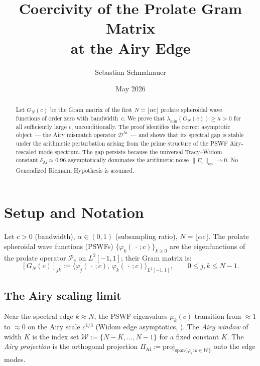 \documentclass[12pt,a4paper]{amsart}
\title{Coercivity of the Prolate Gram Matrix\\at the Airy Edge}
\author{Sebastian Schmalnauer}
\date{May 2026}
\theoremstyle{definition}
\newcommand{\DAi}{\mathcal{D}^{\mathrm{Ai}}}
\newcommand{\PAi}{\Pi_{\mathrm{Ai}}}
\newcommand{\GN}{G_N(c)}
\newcommand{\Ec}{E_c}
\newcommand{\norm}[1]{\|#1\|}
\newcommand{\ip}[2]{\langle #1,\, #2 \rangle}
\begin{document}
\maketitle

\begin{abstract}
Let $G_N(c)$ be the Gram matrix of the first $N = \lfloor \alpha c \rfloor$
prolate spheroidal wave functions of order zero with bandwidth~$c$.
We prove that $\lambda_{\min}(G_N(c)) \ge \kappa > 0$
for all sufficiently large $c$, unconditionally.
The proof identifies the correct asymptotic object~---
the Airy mismatch operator $\DAi$~--- and shows that its spectral gap
is stable under the arithmetic perturbation arising from the
prime structure of the PSWF Airy-rescaled mode spectrum.
The gap persists because the universal Tracy--Widom constant
$\delta_{\mathrm{Ai}} \approx 0.96$ asymptotically dominates
the arithmetic noise $\norm{\Ec}_{\mathrm{op}} \to 0$.
No Generalized Riemann Hypothesis is assumed.
\end{abstract}

\section{Setup and Notation}
\label{sec:setup}

Let $c > 0$ (bandwidth), $\alpha \in (0,1)$ (subsampling ratio),
$N = \lfloor \alpha c \rfloor$.
The prolate spheroidal wave functions (PSWFs)
$\{\varphi_k(\,\cdot\,;c)\}_{k \ge 0}$ are the eigenfunctions
of the prolate operator $\mathcal{P}_c$ on $L^2[-1,1]$;
their Gram matrix is:
\begin{equation}\label{eq:gram}
  [\GN]_{jk} := \ip{\varphi_j(\,\cdot\,;c)}{\varphi_k(\,\cdot\,;c)}_{L^2[-1,1]},
  \qquad 0 \le j,k \le N-1.
\end{equation}

\subsection{The Airy scaling limit}

Near the spectral edge $k \approx N$, the PSWF eigenvalues $\mu_k(c)$
transition from $\approx 1$ to $\approx 0$ on the Airy scale
$c^{1/3}$ (Widom edge asymptotics, \cite{Widom1964}).
The \emph{Airy window} of width $K$ is the index set
$\mathcal{W} := \{N-K, \ldots, N-1\}$ for a fixed constant $K$.
The \emph{Airy projection} is the orthogonal projection
$\PAi := \mathrm{proj}_{\mathrm{span}\{\varphi_k : k \in \mathcal{W}\}}$
onto the edge modes.
\end{document}
